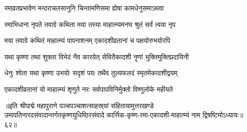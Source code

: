 \twolineshloka
{रमाव्रतप्रभावेण मन्दराचलसानुनि}
{चिन्तामणिसमा ह्येषा कामधेनुसमाऽथवा}%

\twolineshloka
{रमाभिधाना नृपते तवाग्रे कथिता मया}
{तस्या माहात्म्यमनघ श्रुतं सर्वं त्वया नृप}%

\twolineshloka
{मया तवाग्रे कथितं माहात्म्यं पापनाशनम्}
{एकादशीव्रतानां च पक्षयोरुभयोरपि}%

\twolineshloka
{यथा कृष्णा तथा शुक्ला विभेदं नैव कारयेत्}
{सेवितैकादशी नॄणां भुक्तिमुक्तिप्रदायिनी}%

\twolineshloka
{धेनुः श्वेता यथा कृष्णा उभयोः सदृशं पयः}
{तथैव तुल्यफलदं स्मृतमेकादशीद्वयम्}%

\twolineshloka
{एकादशीव्रतानां यो माहात्म्यं शृणुते नरः}
{सर्वपापविनिर्मुक्तो विष्णुलोके महीयते}%

॥इति श्रीपाद्मे महापुराणे पञ्चपञ्चाशत्साहस्र्यां संहितायामुत्तरखण्डे उमापतिनारदसंवादान्तर्गतकृष्णयुधिष्ठिरसंवादे कार्त्तिक-कृष्ण-रमा-एकादशी-माहात्म्यं नाम द्विषष्टिमोऽध्यायः॥६२॥

\genMangalaShloka

\hyperref[sec:ekadashi_mahatmyam_padma_puranam]{\closesub}
\clearpage

